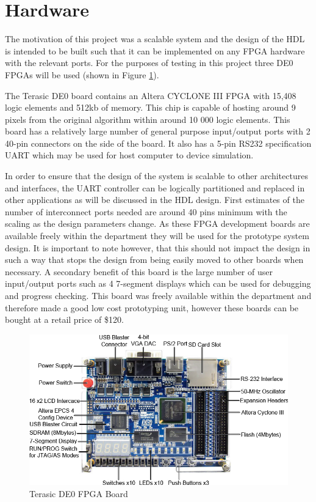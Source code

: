 \section{Hardware}
The motivation of this project was a scalable system and the design of the HDL is intended to be built such that it can be implemented on any FPGA hardware with the relevant ports. For the purposes of testing in this project three DE0 FPGAs will be used (shown in Figure \ref{fig:de0}).


The Terasic DE0 board contains an Altera CYCLONE III FPGA with 15,408 logic elements and 512kb of memory. This chip is capable of hosting around 9 pixels from the original algorithm within around 10 000 logic elements. This board has a relatively large number of general purpose input/output ports with 2 40-pin connectors on the side of the board. It also has a 5-pin RS232 specification UART which may be used for host computer to device simulation. 

In order to  ensure that the design of the system is scalable to other architectures and interfaces, the UART controller can be logically partitioned and replaced in other applications as will be discussed in the HDL design.  First estimates of the number of interconnect ports needed are around 40 pins minimum with the scaling as the design parameters change. As these FPGA development boards are available freely within the department they will be used for the prototype system design. It is important to note however, that this should not impact the design in such a way that stops the design from being easily moved to other boards when necessary. A secondary benefit of this board is the large number of user input/output ports such as 4 7-segment displays which can be used for debugging and progress checking.  This board was freely available within the department and therefore made a good low cost prototyping unit, however these boards can be bought at a retail price of \$120. 


\begin{figure}[h!]
  \includegraphics[width=\textwidth]{./figs/de0.png}
  \caption{Terasic DE0 FPGA Board}
  \label{fig:de0}
\end{figure}


